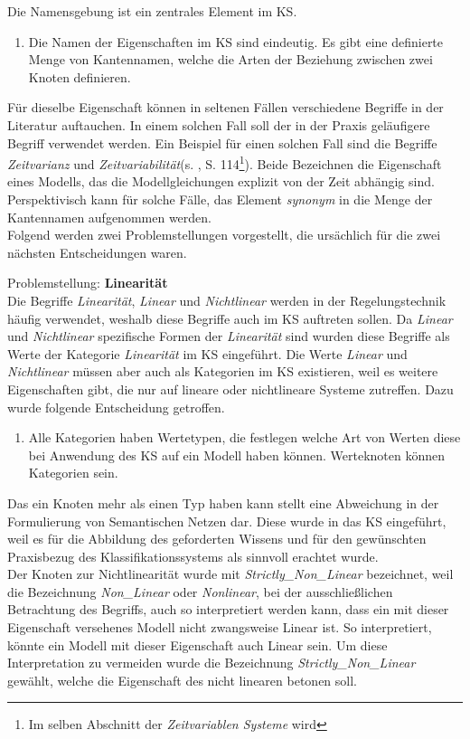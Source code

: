 Die Namensgebung ist ein zentrales Element im KS.
\begin{enumerate}[resume*]
	\item \label{E.KS_Namensgebung}Die Namen der Eigenschaften im KS sind eindeutig. Es gibt eine definierte Menge von Kantennamen, welche die Arten der Beziehung zwischen zwei Knoten definieren.
\end{enumerate}
Für dieselbe Eigenschaft können in seltenen Fällen verschiedene Begriffe in der Literatur auftauchen. In einem solchen Fall soll der in der Praxis geläufigere Begriff verwendet werden. Ein Beispiel für einen solchen Fall sind die Begriffe \textit{Zeitvarianz} und \textit{Zeitvariabilität}(s. \cite{LUN10}, S. 114\footnote{Im selben Abschnitt der \textit{Zeitvariablen Systeme} wird }). Beide Bezeichnen die Eigenschaft eines Modells, das die Modellgleichungen explizit von der Zeit abhängig sind. Perspektivisch kann für solche Fälle, das Element \textit{synonym} in die Menge der Kantennamen aufgenommen werden.\\
Folgend werden zwei Problemstellungen vorgestellt, die ursächlich für die zwei nächsten Entscheidungen waren.

Problemstellung: \textbf{Linearität}\\
Die Begriffe \textit{Linearität}, \textit{Linear} und \textit{Nichtlinear} werden in der Regelungstechnik häufig verwendet, weshalb diese Begriffe auch im KS auftreten sollen. Da \textit{Linear} und \textit{Nichtlinear} spezifische Formen der \textit{Linearität} sind wurden diese Begriffe als Werte der Kategorie \textit{Linearität} im KS eingeführt. Die Werte \textit{Linear} und \textit{Nichtlinear} müssen aber auch als Kategorien im KS existieren, weil es weitere Eigenschaften gibt, die nur auf lineare oder nichtlineare Systeme zutreffen. Dazu wurde folgende Entscheidung getroffen.
\begin{enumerate}[resume*]
	\item \label{E.KS_Werteknoten}Alle Kategorien haben Wertetypen, die festlegen welche Art von Werten diese bei Anwendung des KS auf ein Modell haben können. Werteknoten können Kategorien sein.
\end{enumerate}
Das ein Knoten mehr als einen Typ haben kann stellt eine Abweichung in der Formulierung von Semantischen Netzen dar. Diese wurde in das KS eingeführt, weil es für die Abbildung des geforderten Wissens und für den gewünschten Praxisbezug des Klassifikationssystems als sinnvoll erachtet wurde.\\
Der Knoten zur Nichtlinearität wurde mit \textit{Strictly\_Non\_Linear} bezeichnet, weil die Bezeichnung \textit{Non\_Linear} oder \textit{Nonlinear}, bei der ausschließlichen Betrachtung des Begriffs, auch so interpretiert werden kann, dass ein mit dieser Eigenschaft versehenes Modell nicht zwangsweise Linear ist. So interpretiert, könnte ein Modell mit dieser Eigenschaft auch Linear sein. Um diese Interpretation zu vermeiden wurde die Bezeichnung \textit{Strictly\_Non\_Linear} gewählt, welche die Eigenschaft des nicht linearen betonen soll.\\ 


